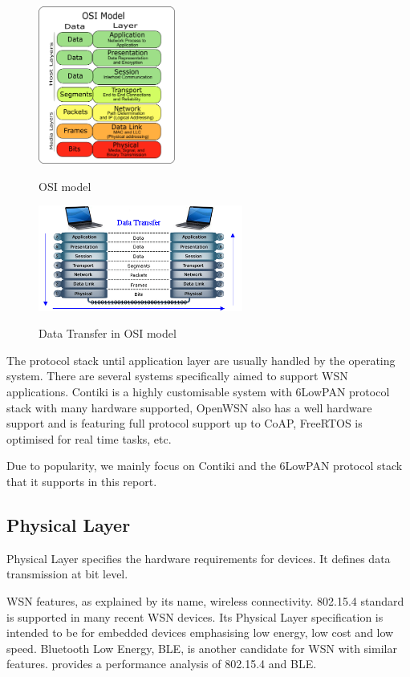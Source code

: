 \begin{figure}
	\centering
	{
		\includegraphics[width=0.4\textwidth,]{fig/Osi-model-jb.png}
	}
	\caption{OSI model} \label{fig: OSI model}
\end{figure}

\begin{figure}
	\centering
	{
		\includegraphics[width=0.6\textwidth,]{fig/Osi-model.png}
	}
	\caption{Data Transfer in OSI model} \label{fig: OSI channel}
\end{figure}

The protocol stack until application layer are usually handled by the operating system. There are several systems specifically aimed to support WSN applications. Contiki\cite{Contiki} is a highly customisable system with 6LowPAN protocol stack with many hardware supported, OpenWSN\cite{OpenWSN} also has a well hardware support and is featuring full protocol support up to CoAP\cite{rfc7252}, FreeRTOS\cite{FreeRTOS} is optimised for real time tasks, etc.

Due to popularity, we mainly focus on Contiki and the 6LowPAN protocol stack that it supports in this report.

\subsection{Physical Layer}
Physical Layer specifies the hardware requirements for devices. It defines data transmission at bit level.

WSN features, as explained by its name, wireless connectivity. 802.15.4\cite{802154} standard is supported in many recent WSN devices. Its Physical Layer specification is intended to be for embedded devices emphasising low energy, low cost and low speed. Bluetooth Low Energy, BLE, is another candidate for WSN with similar features. \cite{802154BLE} provides a performance analysis of 802.15.4 and BLE.

